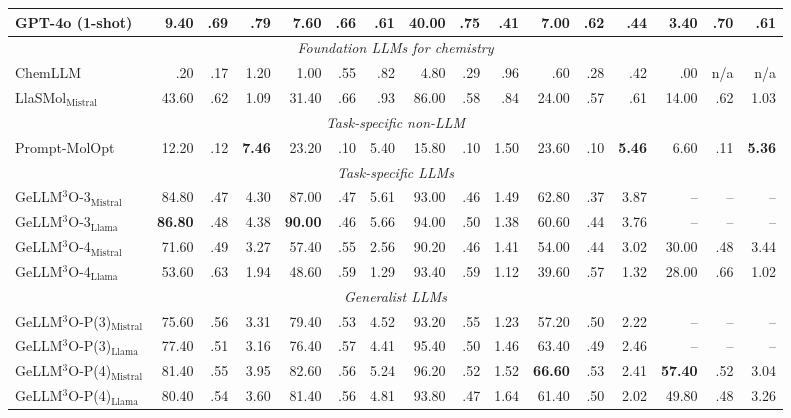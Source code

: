 \begin{table}[t]
{\begin{tabular}{lrrrrrrrrrrrrrrr}
    GPT-4o (1-shot) & 9.40 & .69 & .79 & 7.60 & .66 & .61 & 40.00 & \textbf{.75} & .41 & 7.00 & .62 & .44 & 3.40 & .70 & .61 \\
    \midrule
    \multicolumn{16}{c}{\textit{Foundation LLMs for chemistry}} \\
    ChemLLM & .20 & .17 & 1.20 & 1.00 & .55 & .82 & 4.80 & .29 & .96 & .60 & .28 & .42 & .00 & n/a & n/a \\
    LlaSMol$_{\mathrm{Mistral}}$ & 43.60 & .62 & 1.09 & 31.40 & .66 & .93 & 86.00 & .58 & .84 & 24.00 & .57 & .61 & 14.00 & .62 & 1.03 \\
    \midrule
    \multicolumn{16}{c}{\textit{Task-specific non-LLM}} \\
    Prompt-MolOpt & 12.20 & .12 & \textbf{7.46} & 23.20 & .10 & 5.40 & 15.80 & .10 & 1.50 & 23.60 & .10 & \textbf{5.46} & 6.60 & .11 & \textbf{5.36} \\
    \midrule
    \multicolumn{16}{c}{\textit{Task-specific LLMs}} \\
    GeLLM$^3$O-3$_{\mathrm{Mistral}}$ & 84.80 & .47 & 4.30 & 87.00 & .47 & 5.61 & 93.00 & .46 & 1.49 & 62.80 & .37 & 3.87 & -- & -- & -- \\
    GeLLM$^3$O-3$_{\mathrm{Llama}}$ & \textbf{86.80} & .48 & 4.38 & \textbf{90.00} & .46 & 5.66 & 94.00 & .50 & 1.38 & 60.60 & .44 & 3.76 & -- & -- & -- \\
    GeLLM$^3$O-4$_{\mathrm{Mistral}}$ & 71.60 & .49 & 3.27 & 57.40 & .55 & 2.56 & 90.20 & .46 & 1.41 & 54.00 & .44 & 3.02 & 30.00 & .48 & 3.44 \\
    GeLLM$^3$O-4$_{\mathrm{Llama}}$ & 53.60 & .63 & 1.94 & 48.60 & .59 & 1.29 & 93.40 & .59 & 1.12 & 39.60 & .57 & 1.32 & 28.00 & .66 & 1.02 \\
    \midrule
    \multicolumn{16}{c}{\textit{Generalist LLMs}} \\
    GeLLM$^3$O-P(3)$_{\mathrm{Mistral}}$ & 75.60 & .56 & 3.31 & 79.40 & .53 & 4.52 & 93.20 & .55 & 1.23 & 57.20 & .50 & 2.22 & -- & -- & -- \\
    GeLLM$^3$O-P(3)$_{\mathrm{Llama}}$ & 77.40 & .51 & 3.16 & 76.40 & .57 & 4.41 & 95.40 & .50 & 1.46 & 63.40 & .49 & 2.46 & -- & -- & -- \\
    GeLLM$^3$O-P(4)$_{\mathrm{Mistral}}$ & 81.40 & .55 & 3.95 & 82.60 & .56 & 5.24 & 96.20 & .52 & 1.52 & \textbf{66.60} & .53 & 2.41 & \textbf{57.40} & .52 & 3.04 \\
    GeLLM$^3$O-P(4)$_{\mathrm{Llama}}$ & 80.40 & .54 & 3.60 & 81.40 & .56 & 4.81 & 93.80 & .47 & 1.64 & 61.40 & .50 & 2.02 & 49.80 & .48 & 3.26 \\

\end{tabular}}
\end{table}
